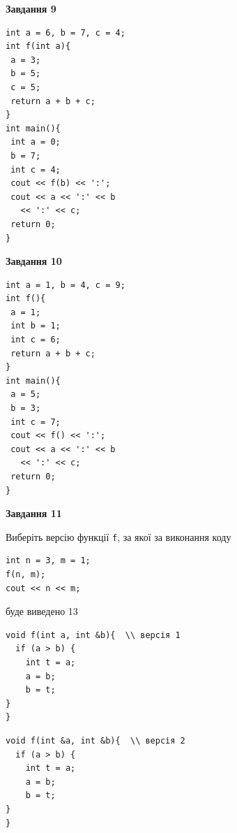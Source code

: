 \documentclass[12pt, ukrainian]{article}
\def\code#1{\Verb!#1!}
\begin{document}
{\begin {large}
\begin{minipage}[t]{11.0cm}
\end{minipage}


\begin{minipage}[t]{7.0cm}

\begin{center}
\textbf{Завдання 9}
\end{center}
\vspace{-8mm}

\begin{verbatim}
int a = 6, b = 7, c = 4;
int f(int a){
 a = 3;
 b = 5;
 c = 5;
 return a + b + c;
}
int main(){
 int a = 0;
 b = 7;
 int c = 4;
 cout << f(b) << ':';
 cout << a << ':' << b 
   << ':' << c;
 return 0;
}
\end{verbatim}



\begin{center}
\textbf{Завдання 10}
\end{center}
\vspace{-8mm}

\begin{verbatim}
int a = 1, b = 4, c = 9;
int f(){
 a = 1;
 int b = 1;
 int c = 6;
 return a + b + c;
}
int main(){
 a = 5;
 b = 3;
 int c = 7;
 cout << f() << ':';
 cout << a << ':' << b 
   << ':' << c;
 return 0;
}
\end{verbatim}

\end{minipage}
\vline \hspace{1mm}
\begin{minipage}[t]{11.0cm}

\begin{center}
\textbf{Завдання 11}
\end{center}
Виберіть версію функції \code{f}, за якої за виконання коду
\begin{verbatim}
int n = 3, m = 1;
f(n, m);
cout << n << m;
\end{verbatim}

буде виведено 13

\begin{verbatim}
void f(int a, int &b){  \\ версія 1
  if (a > b) {
    int t = a;
    a = b;
    b = t;
}  
}
\end{verbatim}

\vspace{-8mm}\begin{verbatim}
void f(int &a, int &b){  \\ версія 2
  if (a > b) {
    int t = a;
    a = b;
    b = t;
}  
}
\end{verbatim}


\end{minipage}
\end{large}}
\end{document}
